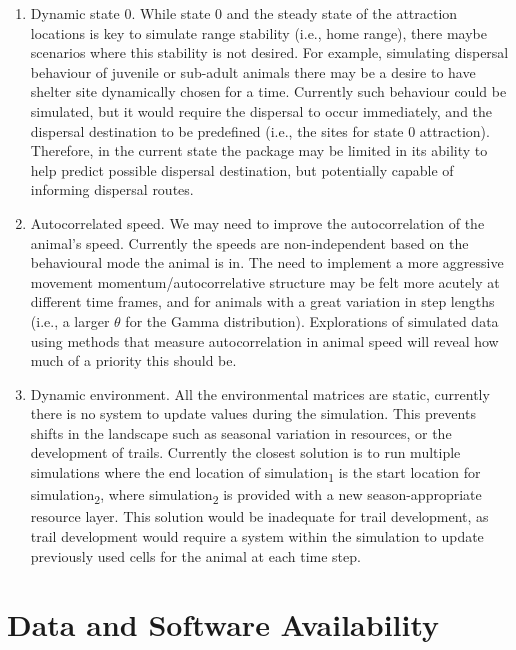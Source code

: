 \documentclass[10pt,a4paper]{article}
\begin{document}
\begin{enumerate}
\def\labelenumi{\arabic{enumi}.}
\item
  Dynamic state 0. While state 0 and the steady state of the attraction locations is key to simulate range stability (i.e., home range), there maybe scenarios where this stability is not desired.
  For example, simulating dispersal behaviour of juvenile or sub-adult animals there may be a desire to have shelter site dynamically chosen for a time.
  Currently such behaviour could be simulated, but it would require the dispersal to occur immediately, and the dispersal destination to be predefined (i.e., the sites for state 0 attraction).
  Therefore, in the current state the package may be limited in its ability to help predict possible dispersal destination, but potentially capable of informing dispersal routes.
\item
  Autocorrelated speed. We may need to improve the autocorrelation of the animal's speed.
  Currently the speeds are non-independent based on the behavioural mode the animal is in.
  The need to implement a more aggressive movement momentum/autocorrelative structure may be felt more acutely at different time frames, and for animals with a great variation in step lengths (i.e., a larger \(\theta\) for the Gamma distribution).
  Explorations of simulated data using methods that measure autocorrelation in animal speed will reveal how much of a priority this should be.
\item
  Dynamic environment. All the environmental matrices are static, currently there is no system to update values during the simulation.
  This prevents shifts in the landscape such as seasonal variation in resources, or the development of trails.
  Currently the closest solution is to run multiple simulations where the end location of simulation\textsubscript{1} is the start location for simulation\textsubscript{2}, where simulation\textsubscript{2} is provided with a new season-appropriate resource layer.
  This solution would be inadequate for trail development, as trail development would require a system within the simulation to update previously used cells for the animal at each time step.
\end{enumerate}

\hypertarget{data-and-software-availability}{%
\section{Data and Software Availability}\label{data-and-software-availability}}
\end{document}
